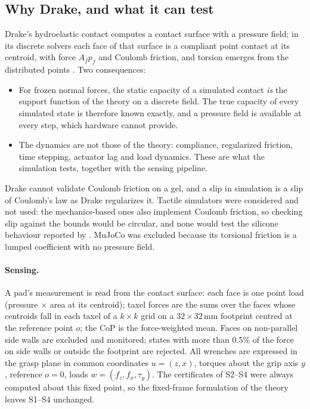 \documentclass[11pt,a4paper]{article}
\begin{document}
\subsection{Why Drake, and what it can test}
\label{sec:simulator}
Drake's hydroelastic contact computes a contact surface with a pressure field; in its discrete solvers each face of that surface is a compliant
point contact at its centroid, with force $A_fp_f$ and Coulomb friction, and torsion emerges from the distributed points
\citep{masterjohn2022velocity}. Two consequences:
\begin{itemize}
    \item For frozen normal forces, the static capacity of a simulated contact \emph{is} the support function of the theory on a discrete field.
    The true capacity of every simulated state is therefore known exactly, and a pressure field is available at every step, which hardware
    cannot provide.
    \item The dynamics are not those of the theory: compliance, regularized friction, time stepping, actuator lag and load dynamics. These are
    what the simulation tests, together with the sensing pipeline.
\end{itemize}
Drake cannot validate Coulomb friction on a gel, and a slip in simulation is a slip of Coulomb's law as Drake regularizes it. Tactile simulators
were considered and not used: the mechanics-based ones also implement Coulomb friction, so checking slip against the bounds would be circular,
and none would test the silicone behaviour reported by \citet[§3]{howe1996practical}. MuJoCo was excluded because its torsional friction is a
lumped coefficient with no pressure field.

\paragraph{Sensing.} A pad's measurement is read from the contact surface: each face is one point load (pressure $\times$ area at its centroid);
taxel forces are the sums over the faces whose centroids fall in each taxel of a $k\times k$ grid on a $32\times32$\,mm footprint centred at the
reference point $o$; the CoP is the force-weighted mean. Faces on non-parallel side walls are excluded and monitored; states with more than
0.5\% of the force on side walls or outside the footprint are rejected. All wrenches are expressed in the grasp plane in common coordinates
$u=(z,x)$, torques about the grip axis $y$, reference $o=0$, loads $w=(f_z,f_x,\tau_y)$. The certificates of S2--S4 were always computed about this
fixed point, so the fixed-frame formulation of the theory leaves S1--S4 unchanged.
\end{document}
